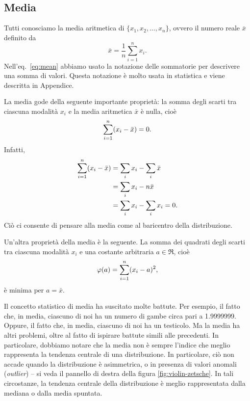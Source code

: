 \documentclass[
  11pt,
  italian,
  a4paper,
  extrafontsizes,onecolumn,openright
  ]{memoir}
\theoremstyle{definition}
\theoremstyle{definition}
\theoremstyle{definition}
\theoremstyle{definition}
\theoremstyle{remark}
\begin{document}
\hypertarget{media}{%
\subsection{Media}\label{media}}

Tutti conosciamo la media aritmetica di \(\{x_1, x_2, \dots, x_n\}\),
ovvero il numero reale \(\bar{x}\) definito da
\begin{equation}
\bar{x}=\frac{1}{n}\sum_{i=1}^n x_i.
\label{eq:mean}
\end{equation}
Nell'eq.~\eqref{eq:mean} abbiamo usato la notazione delle sommatorie
per descrivere una somma di valori. Questa notazione è molto usata in
statistica e viene descritta in Appendice.

La media gode della seguente importante proprietà: la somma degli scarti
tra ciascuna modalità \(x_i\) e la media aritmetica \(\bar{x}\) è nulla,
cioè
\[
\sum_{i=1}^n (x_i - \bar{x}) = 0.\notag
\label{eq:diffmeansumzero}\] Infatti, \[\begin{aligned}
\sum_{i=1}^n (x_i - \bar{x}) &= \sum_i x_i - \sum_i \bar{x}\notag\\
&= \sum_i x_i - n \bar{x}\notag\\
&= \sum_i x_i - \sum_i x_i = 0.\notag\end{aligned}
\]
Ciò ci consente di pensare alla media come al baricentro della distribuzione.

Un'altra proprietà della media è la seguente. La somma dei quadrati
degli scarti tra ciascuna modalità \(x_i\) e una costante arbitraria
\(a \in \Re\), cioè \[\varphi(a) = \sum_{i=1}^n (x_i - a)^2,\notag\] è
minima per \(a = \bar{x}\).

Il concetto statistico di media ha suscitato molte battute. Per esempio,
il fatto che, in media, ciascuno di noi ha un numero di gambe circa pari
a 1.9999999. Oppure, il fatto che, in media, ciascuno di noi ha un
testicolo. Ma la media ha altri problemi, oltre al fatto di ispirare
battute simili alle precedenti. In particolare, dobbiamo notare che la
media non è sempre l'indice che meglio rappresenta la tendenza centrale
di una distribuzione. In particolare, ciò non accade quando la
distribuzione è asimmetrica, o in presenza di valori anomali (\emph{outlier})
-- si veda il pannello di destra della figura \ref{fig:violin-zetsche}. In tali circostanze, la tendenza centrale della distribuzione è meglio rappresentata dalla mediana o dalla media spuntata.
\end{document}
